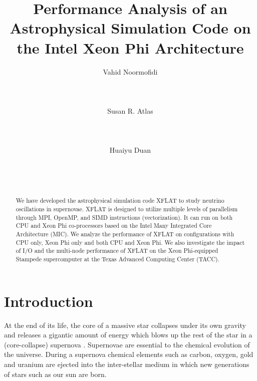 \documentclass{sig-alternate}
\begin{document}
\permission{}

\title{Performance Analysis of an Astrophysical Simulation Code on the Intel Xeon Phi Architecture}

\author{
\alignauthor
Vahid Noormofidi\\
       \\
       \\
       \\
\alignauthor
Susan R. Atlas\\
       \\
       \\
       \\
\alignauthor
Huaiyu Duan\\
       \\
       \\
       \\
}

\maketitle
\begin{abstract}
We have developed the astrophysical simulation code XFLAT to study
neutrino oscillations in supernovae. XFLAT is designed to utilize
multiple levels of parallelism through MPI, OpenMP, and SIMD
instructions (vectorization). It can run on both CPU and Xeon Phi
co-processors based on the Intel Many Integrated Core Architecture
(MIC). We analyze the performance of XFLAT on configurations with CPU
only, Xeon Phi only and both CPU and Xeon Phi. We also investigate the
impact of I/O and the multi-node performance of XFLAT on the Xeon
Phi-equipped Stampede supercomputer at the Texas Advanced Computing
Center (TACC). 
\end{abstract}


\section{Introduction}
At the end of its life, the core of a massive star collapses under its
own gravity and releases a gigantic amount of energy which blows up the
rest of the star in a (core-collapse) supernova
\cite{Woosley:2005yv}. Supernovae are 
essential to the chemical evolution of the universe. 
During a supernova chemical elements such as carbon, oxygen,
gold and uranium are ejected into the inter-stellar medium in which
new generations of stars such as our sun are born.
\end{document}
